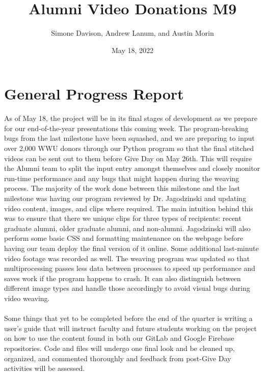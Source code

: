 \documentclass{article}
\title{Alumni Video Donations M9}
\author{Simone Davison, Andrew Lanum, and Austin Morin }
\date{May 18, 2022}
\begin{document}
\maketitle

\section{General Progress Report}
As of May 18, the project will be in its final stages of development as we prepare 
for our end-of-the-year presentations this coming week. The program-breaking bugs 
from the last milestone have been squashed, and we are preparing to input over 2,000 
WWU donors through our Python program so that the final stitched videos can be sent 
out to them before Give Day on May 26th. This will require the Alumni team to split 
the input entry amongst themselves and closely monitor run-time performance and any 
bugs that might happen during the weaving process. The majority of the work done 
between this milestone and the last milestone was having our program reviewed 
by Dr. Jagodzinski and updating video content, images, and clips where required. 
The main intuition behind this was to ensure that there we unique clips for three 
types of recipients: recent graduate alumni, older graduate alumni, and non-alumni. 
Jagodzinski will also perform some basic CSS and formatting maintenance on the webpage 
before having our team deploy the final version of it online. Some additional 
last-minute video footage was recorded as well. The weaving program was updated 
so that multiprocessing passes less data between processes to speed up performance 
and saves work if the program happens to crash. It can also distinguish between different image types and handle those accordingly to avoid visual bugs during video weaving.\\~\\Some things that yet to be completed before the 
end of the quarter is writing a user's guide that will instruct faculty and future students 
working on the project on how to use the content found in both our GitLab and Google Firebase 
repositories. Code and files will undergo one final look and be cleaned up, organized, and 
commented thoroughly and feedback from post-Give Day activities will be assessed.
\end{document}
